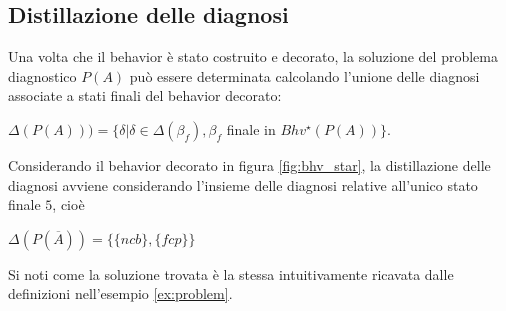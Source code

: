 \subsection{Distillazione delle diagnosi}
Una volta che il behavior è stato costruito e decorato, la soluzione del problema diagnostico $P(A)$ può essere determinata calcolando l'unione delle diagnosi associate a stati finali del behavior decorato:
\begin{center}
$\Delta(P(A))) = \{\delta | \delta \in \Delta(\beta_f), \beta_f$ finale in $Bhv^\star(P(A))\}$.
\end{center}


\begin{ex}
Considerando il behavior decorato in figura \ref{fig:bhv_star}, la distillazione delle diagnosi avviene considerando l'insieme delle diagnosi relative all'unico stato finale $5$, cioè
\begin{center}
$\Delta(P(\overline{A})) = \{\{ncb\},\{fcp\}\}$
\end{center}
Si noti come la soluzione trovata è la stessa intuitivamente ricavata dalle definizioni nell'esempio \ref{ex:problem}.
\end{ex}